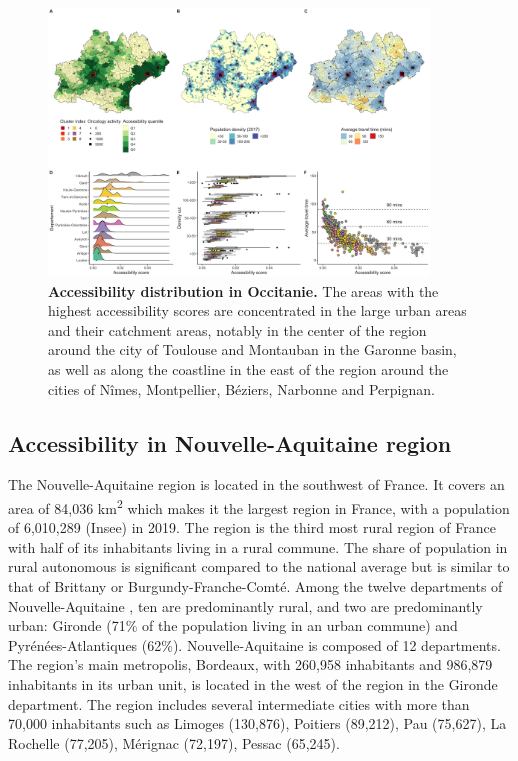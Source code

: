 \begin{figure}[h!]
    \includegraphics[width=0.9\textwidth]{images/camion/region_accessibility/accessibility_Occitanie.png}
    \centering
    \caption{
        \textbf{Accessibility distribution in Occitanie.} The areas with the highest accessibility scores are concentrated in
        the large urban areas and their catchment areas, notably in the center of the
        region around the city of Toulouse and Montauban in the Garonne basin, as well
        as along the coastline in the east of the region around the cities of Nîmes,
        Montpellier, Béziers, Narbonne and Perpignan.
    }
\end{figure}

\subsection*{Accessibility in Nouvelle-Aquitaine region}

The Nouvelle-Aquitaine region is located in the southwest of France. It covers
an area of 84,036 km\textsuperscript{2} which makes it the largest region in
France, with a population of 6,010,289 (Insee) in 2019. The region is the third
most rural region of France with half of its inhabitants living in a rural
commune. The share of population in rural autonomous is significant compared to
the national average but is similar to that of Brittany or
Burgundy-Franche-Comté. Among the twelve departments of Nouvelle-Aquitaine , ten
are predominantly rural, and two are predominantly urban: Gironde (71\% of the
population living in an urban commune) and Pyrénées-Atlantiques (62\%).
Nouvelle-Aquitaine is composed of 12 departments. The region's main metropolis,
Bordeaux, with 260,958 inhabitants and 986,879 inhabitants in its urban unit, is
located in the west of the region in the Gironde department. The region includes
several intermediate cities with more than 70,000 inhabitants such as Limoges
(130,876), Poitiers (89,212), Pau (75,627), La Rochelle (77,205), Mérignac
(72,197), Pessac (65,245).

